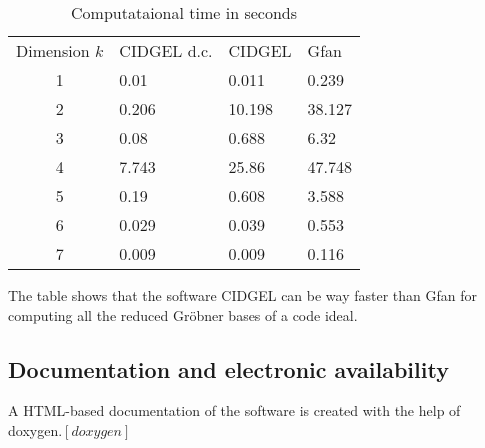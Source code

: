  \begin{table}[h]
 \caption{Computataional time in seconds}
 \begin{tabular}{clll} %
  Dimension $k$ & CIDGEL d.c. & CIDGEL & Gfan \\
  1  & 0.01  & 0.011  & 0.239  \\
  2  & 0.206 & 10.198 & 38.127 \\
  3  & 0.08  & 0.688  & 6.32 \\
  4  & 7.743 & 25.86  & 47.748 \\
  5  & 0.19  & 0.608  & 3.588  \\
  6  & 0.029 & 0.039  & 0.553\\
  7  & 0.009 & 0.009  & 0.116 \\
 \end{tabular}
 \label{tab:meinetabelle}
 \end{table}
 
 The table shows that the software CIDGEL can be way faster than Gfan for computing all the reduced Gröbner bases of a code ideal. 




\subsection{Documentation and electronic availability}
\label{subsec:docu}
A HTML-based documentation of the software is created with the help of doxygen.$[doxygen]$

\newpage


